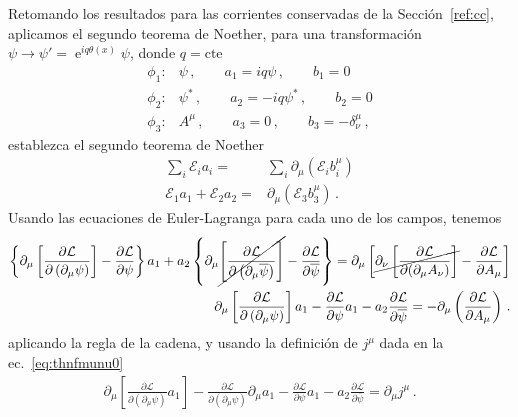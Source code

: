 \begin{frame}
Retomando los resultados para las corrientes conservadas de la Sección~\ref{ref:cc}, aplicamos el segundo teorema de Noether, para una transformación $\psi\to \psi'= \operatorname{e}^{iq\theta(x)}\psi$, donde $q=\text{cte} $
\begin{align}
\label{eq:dpa}
  \phi_{1}:& \psi\,,\qquad a_{1}=iq \psi \,,\qquad b_1=0\nonumber\\
  \phi_{2}:& \psi^{*}\,,\qquad a_{2}=-iq\psi^{*}\,,\qquad b_2=0 \nonumber\\
  \phi_{3}:& A^{\mu}\,,\qquad a_{3}=0\,,\qquad b_3=-\delta^{\mu}_{\nu}\,,
\end{align}
establezca el segundo teorema de Noether
\begin{align}
  \sum_i \mathcal{E}_ia_i=&\sum_i  \partial_{\mu}   \left(  \mathcal{E}_i b^{\mu}_i  \right)\nonumber\\
  \mathcal{E}_1a_1+\mathcal{E}_2a_2=&
   \partial_{\mu}   \left(  \mathcal{E}_3 b^{\mu}_3  \right)\,.
\end{align}
Usando las ecuaciones de Euler-Lagranga para cada uno de los campos, tenemos
\begin{align}
\left\{
\partial_{\mu}\left[
\frac{\partial\mathcal{L}}{\partial\left(\partial_{\mu} \psi\right)}
\right]-\frac{\partial \mathcal{L}}{\partial\psi}
\right\} a_{1}
+
a_{2}\left\{\partial_{\mu}\cancel{\left[\frac{\partial \mathcal{L}}{\partial\left(\partial_{\mu} \overline{\psi}\right)}\right]}- \frac{\partial \mathcal{L}}{\partial \overline{\psi}}\right\}
=\partial_{\mu}\left[\cancel{\partial_{\nu}\left[\frac{\partial \mathcal{L}}{\partial (\partial_{\mu} A_{\nu})}\right]}-\frac{\partial \mathcal{L}}{\partial A_{\mu}}\right]\nonumber\\
\partial_{\mu}\left[
\frac{\partial\mathcal{L}}{\partial\left(\partial_{\mu} \psi\right)}
\right] a_{1}
-\frac{\partial \mathcal{L}}{\partial\psi}a_1
-a_2\frac{\partial \mathcal{L}}{\partial \overline{\psi}}
=-\partial_{\mu}\left(\frac{\partial \mathcal{L}}{\partial A_{\mu}}\right)\,.
\end{align}
aplicando la regla de la cadena,  y usando la definición de $j^\mu$ dada en la ec.~\eqref{eq:thnfmunu0}
\begin{align}
\partial_{\mu}\left[
\frac{\partial\mathcal{L}}{\partial\left(\partial_{\mu} \psi\right)}
a_{1}
\right]
-
\frac{\partial\mathcal{L}}{\partial\left(\partial_{\mu} \psi\right)}
\partial_{\mu}a_{1}
-\frac{\partial \mathcal{L}}{\partial\psi}a_1
-a_2\frac{\partial \mathcal{L}}{\partial \overline{\psi}}
=\partial_{\mu}j^{\mu}\,.
\end{align}


\end{frame}
